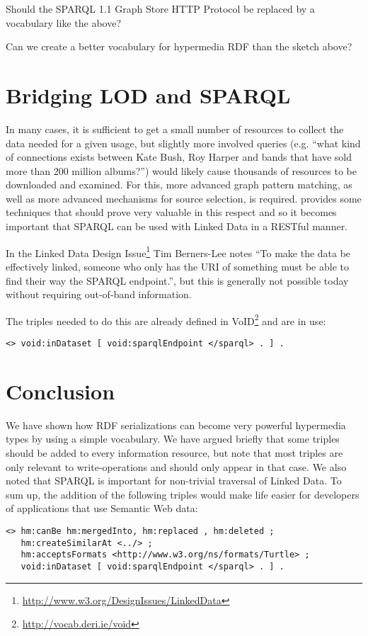 \documentclass{llncs}
\begin{document}
\begin{question}
Should the SPARQL 1.1 Graph Store HTTP Protocol be replaced by a
vocabulary like the above?
\end{question}

\begin{question}
Can we create a better vocabulary for hypermedia RDF than the sketch above?
\end{question}

\section{Bridging LOD and SPARQL}

In many cases, it is sufficient to get a small number of resources to
collect the data needed for a given usage, but slightly more involved
queries (e.g. ``what kind of connections exists between Kate Bush, Roy
Harper and bands that have sold more than 200 million albums?'') would
likely cause thousands of resources to be downloaded and examined. For
this, more advanced graph pattern matching, as well as more advanced
mechanisms for source selection, is
required. \cite{springerlink:10.1007/978-3-642-25073-6-38} provides
some techniques that should prove very valuable in this respect and so
it becomes important that SPARQL can be used with Linked Data in a
RESTful manner.

In the Linked Data Design
Issue\footnote{\url{http://www.w3.org/DesignIssues/LinkedData}} Tim
Berners-Lee notes ``To make the data be effectively linked, someone
who only has the URI of something must be able to find their way the
SPARQL endpoint.'', but this is generally not possible today without
requiring out-of-band information.

The triples needed to do this are already defined in
VoID\footnote{\url{http://vocab.deri.ie/void}} and are in use:
\begin{verbatim}
<> void:inDataset [ void:sparqlEndpoint </sparql> . ] .
\end{verbatim}

\section{Conclusion}

We have shown how RDF serializations can become very powerful
hypermedia types by using a simple vocabulary. We have argued briefly
that some triples should be added to every information resource, but
note that most triples are only relevant to write-operations and
should only appear in that case. We also noted that SPARQL is
important for non-trivial traversal of Linked Data. To sum up, the
addition of the following triples would make life easier for
developers of applications that use Semantic Web data:

\begin{verbatim}
<> hm:canBe hm:mergedInto, hm:replaced , hm:deleted ;
   hm:createSimilarAt <../> ;
   hm:acceptsFormats <http://www.w3.org/ns/formats/Turtle> ;
   void:inDataset [ void:sparqlEndpoint </sparql> . ] .
\end{verbatim}


%
%

\end{document}
